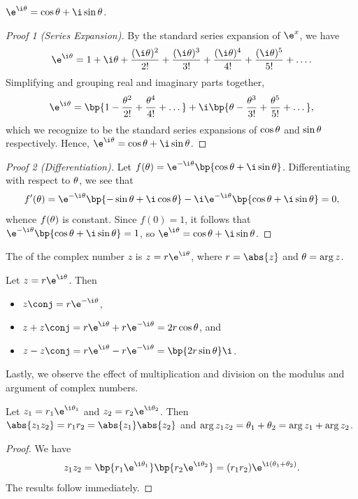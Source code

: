 \begin{theorem}
    $\e^{\i \t} = \cos \t + \i \sin \t$.
\end{theorem}
\begin{proof}[Proof 1 (Series Expansion)]
    By the standard series expansion of $\e^x$, we have \[\e^{\i \t} = 1 + \i \t + \frac{(\i \t)^2}{2!} + \frac{(\i \t)^3}{3!} + \frac{(\i \t)^4}{4!} + \frac{(\i \t)^5}{5!} + \dots.\] Simplifying and grouping real and imaginary parts together, \[\e^{\i \t} = \bp{1 - \frac{\t^2}{2!} + \frac{\t^4}{4!} + \dots} + \i \bp{\t - \frac{\t^3}{3!} + \frac{\t^5}{5!} + \dots},\] which we recognize to be the standard series expansions of $\cos \theta$ and $\sin \theta$ respectively. Hence, $\e^{\i \t} = \cos \t + \i \sin \t$.
\end{proof}
\begin{proof}[Proof 2 (Differentiation)]
    Let $f(\t) = \e^{-\i \t} \bp{\cos \t + \i \sin \t}$. Differentiating with respect to $\theta$, we see that \[f'(\t) = \e^{-\i \t} \bp{-\sin \t + \i \cos \t} - \i \e^{-\i \t} \bp{\cos \t + \i \sin \t} = 0,\] whence $f(\theta)$ is constant. Since $f(0) = 1$, it follows that $\e^{-\i \t} \bp{\cos \t + \i \sin \t} = 1$, so $\e^{\i \t} = \cos \t + \i \sin \t$.
\end{proof}

\begin{definition}
    The  of the complex number $z$ is $z = r \e^{\i \t}$, where $r = \abs{z}$ and $\theta = \arg{z}$.
\end{definition}

\begin{fact}
    Let $z = r \e^{\i \t}$. Then
    \begin{itemize}
        \item $z\conj = r\e^{-\i \t}$,
        \item $z + z\conj = r\e^{\i \t} + r\e^{-\i \t} = 2r\cos \t$, and
        \item $z - z\conj = r\e^{\i \t} - r\e^{-\i \t} = \bp{2r \sin \t} \i$.
    \end{itemize}
\end{fact}

Lastly, we observe the effect of multiplication and division on the modulus and argument of complex numbers.

\begin{proposition}
    Let $z_1 = r_1 \e^{\i \t_1}$ and $z_2 = r_2 \e^{\i \t_2}$. Then $\abs{z_1 z_2} = r_1 r_2 = \abs{z_1} \abs{z_2}$ and $\arg{z_1 z_2} = \theta_1 + \theta_2 = \arg{z_1} + \arg{z_2}$.
\end{proposition}
\begin{proof}
    We have \[z_1 z_2 = \bp{r_1 \e^{\i \t_1}}\bp{r_2 \e^{\i \t_2}} = (r_1 r_2) \e^{\i (\t_1 + \t_2)}.\] The results follow immediately.
\end{proof}

